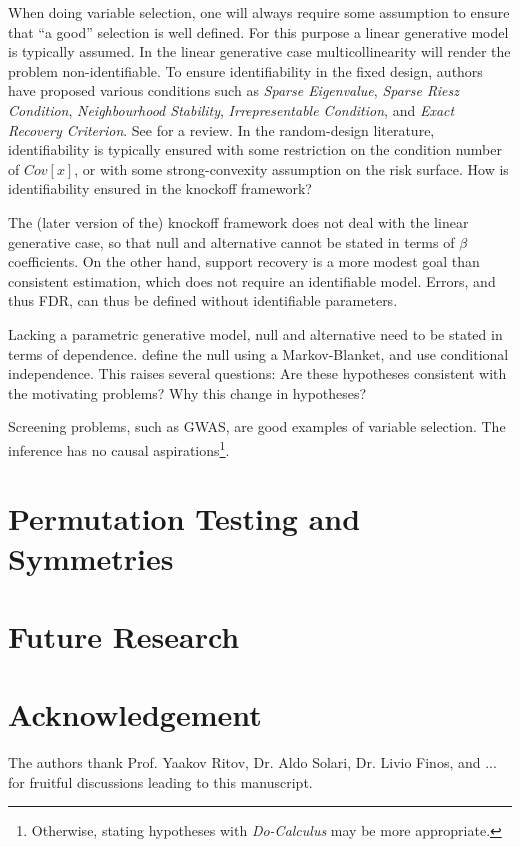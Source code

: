 \documentclass[article,lineno]{biometrika}
\begin{document}
When doing variable selection, one will always require some assumption to ensure that ``a good'' selection is well defined. 
For this purpose a linear generative model is typically assumed. 
In the linear generative case multicollinearity will render the problem non-identifiable. 
To ensure identifiability in the fixed design, authors have proposed various conditions such as \emph{Sparse Eigenvalue}, \emph{Sparse Riesz Condition}, \emph{Neighbourhood Stability}, \emph{Irrepresentable Condition}, and \emph{Exact Recovery Criterion}. 
See \citet[Sec 3.1.1]{MeinshausenStabilityselection2010} for a review. 
In the random-design literature, identifiability is typically ensured with some restriction on the condition number of $Cov[x]$, or with some strong-convexity assumption on the risk surface. 
How is identifiability ensured in the knockoff framework? 

The (later version of the) knockoff framework does not deal with the linear generative case, so that null and alternative cannot be stated in terms of $\beta$ coefficients. 
On the other hand, support recovery is a more modest goal than consistent estimation, which does not require an identifiable model. 
Errors, and thus FDR, can thus be defined without identifiable parameters. 

Lacking a parametric generative model, null and alternative need to be stated in terms of dependence. 
\citet{CandesPanninggoldmodelX2018} define the null using a Markov-Blanket, and \cite{SesiaGenehuntinghidden} use conditional independence. 
This raises several questions:
Are these hypotheses consistent with the motivating problems?
Why this change in hypotheses?

Screening problems, such as GWAS, are good examples of variable selection.
The inference has no causal aspirations\footnote{Otherwise, stating hypotheses with \emph{Do-Calculus} \citep{pearl1995causal} may be more appropriate.}.





\section{Permutation Testing and Symmetries}



\section{Future Research}




\section*{Acknowledgement}
The authors thank Prof. Yaakov Ritov, Dr. Aldo Solari, Dr. Livio Finos, and ... for fruitful discussions leading to this manuscript. 






\end{document}
